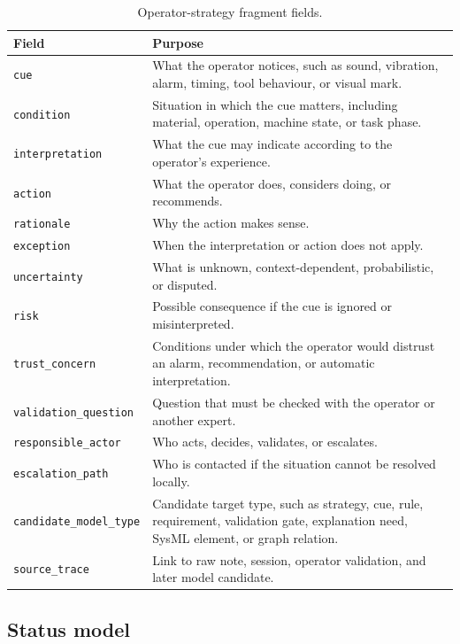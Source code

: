 \begin{table}[htbp]
\centering
\caption{Operator-strategy fragment fields.}
\label{tab:annotation-fields}
\begin{tabularx}{\textwidth}{p{}X}
\toprule
Field & Purpose \\
\midrule
\texttt{cue} & What the operator notices, such as sound, vibration, alarm, timing, tool behaviour, or visual mark. \\
\texttt{condition} & Situation in which the cue matters, including material, operation, machine state, or task phase. \\
\texttt{interpretation} & What the cue may indicate according to the operator's experience. \\
\texttt{action} & What the operator does, considers doing, or recommends. \\
\texttt{rationale} & Why the action makes sense. \\
\texttt{exception} & When the interpretation or action does not apply. \\
\texttt{uncertainty} & What is unknown, context-dependent, probabilistic, or disputed. \\
\texttt{risk} & Possible consequence if the cue is ignored or misinterpreted. \\
\texttt{trust\_concern} & Conditions under which the operator would distrust an alarm, recommendation, or automatic interpretation. \\
\texttt{validation\_question} & Question that must be checked with the operator or another expert. \\
\texttt{responsible\_actor} & Who acts, decides, validates, or escalates. \\
\texttt{escalation\_path} & Who is contacted if the situation cannot be resolved locally. \\
\texttt{candidate\_model\_type} & Candidate target type, such as strategy, cue, rule, requirement, validation gate, explanation need, SysML element, or graph relation. \\
\texttt{source\_trace} & Link to raw note, session, operator validation, and later model candidate. \\
\bottomrule
\end{tabularx}
\end{table}

\subsection{Status model}

